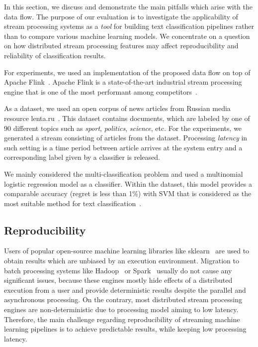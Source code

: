 \label {fs-discussion}

In this section, we discuss and demonstrate the main pitfalls which arise with the data flow. The purpose of our evaluation is to investigate the applicability of stream processing systems as a {\em tool} for building text classification pipelines rather than to compare various machine learning models. We concentrate on a question on how distributed stream processing features may affect reproducibility and reliability of classification results.

For experiments, we used an implementation of the proposed data flow on top of Apache Flink~\cite{Carbone:2017:SMA:3137765.3137777}. Apache Flink is a state-of-the-art industrial stream processing engine that is one of the most performant among competitors~\cite{karimov2018benchmarking, S7530084}. 

As a dataset, we used an open corpus of news articles from Russian media resource lenta.ru~\cite{lentaru}. This dataset contains documents, which are labeled by one of 90 different topics such as {\em sport}, {\em politics}, {\em science}, etc. For the experiments, we generated a stream consisting of articles from the dataset. Processing {\em latency} in such setting is a time period between article arrives at the system entry and a corresponding label given by a classifier is released. 

We mainly considered the multi-classification problem and used a multinomial logistic regression model as a classifier. Within the dataset, this model provides a comparable accuracy (regret is less than 1\%) with SVM that is considered as the most suitable method for text classification~\cite{Kuralenok:2018:CEV:3269206.3271789}.

\subsection{Reproducibility}

Users of popular open-source machine learning libraries like sklearn~\cite{sklearn_api} are used to obtain results which are unbiased by an execution environment. Migration to batch processing systems like Hadoop~\cite{hadoop2009hadoop} or Spark~\cite{Zaharia:2016:ASU:3013530.2934664} usually do not cause any significant issues, because these engines mostly hide effects of a distributed execution from a user and provide deterministic results despite the parallel and asynchronous processing. On the contrary, most distributed stream processing engines are non-deterministic due to processing model aiming to low latency. Therefore, the main challenge regarding reproducibility of streaming machine learning pipelines is to achieve predictable results, while keeping low processing latency.

